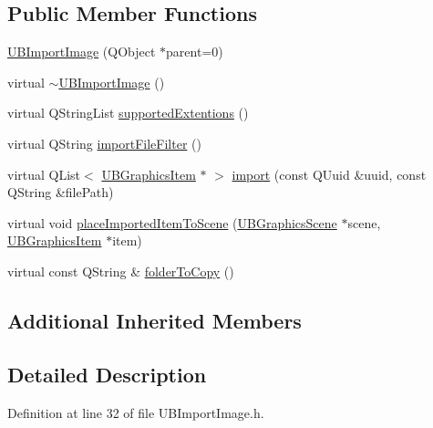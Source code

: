 \subsection*{Public Member Functions}
\begin{DoxyCompactItemize}
\item 
\hyperlink{class_u_b_import_image_a81756efb034d32dffad166b9fbe22cf6}{U\-B\-Import\-Image} (Q\-Object $\ast$parent=0)
\item 
virtual \hyperlink{class_u_b_import_image_a3e86094d5d8a5ccfe41c3397be435471}{$\sim$\-U\-B\-Import\-Image} ()
\item 
virtual Q\-String\-List \hyperlink{class_u_b_import_image_a703a978149e931c7779bf188f9f5c881}{supported\-Extentions} ()
\item 
virtual Q\-String \hyperlink{class_u_b_import_image_a6a54eb0fcdae66407388b3d6e9748a0c}{import\-File\-Filter} ()
\item 
virtual Q\-List$<$ \hyperlink{class_u_b_graphics_item}{U\-B\-Graphics\-Item} $\ast$ $>$ \hyperlink{class_u_b_import_image_a98868eb073c717fd5f1db29709d4dc01}{import} (const Q\-Uuid \&uuid, const Q\-String \&file\-Path)
\item 
virtual void \hyperlink{class_u_b_import_image_a5f2e5cffec433959bf6b13edf3e82b57}{place\-Imported\-Item\-To\-Scene} (\hyperlink{class_u_b_graphics_scene}{U\-B\-Graphics\-Scene} $\ast$scene, \hyperlink{class_u_b_graphics_item}{U\-B\-Graphics\-Item} $\ast$item)
\item 
virtual const Q\-String \& \hyperlink{class_u_b_import_image_ab0070232c0d8722589319f85b63f981e}{folder\-To\-Copy} ()
\end{DoxyCompactItemize}
\subsection*{Additional Inherited Members}


\subsection{Detailed Description}


Definition at line 32 of file U\-B\-Import\-Image.\-h.



